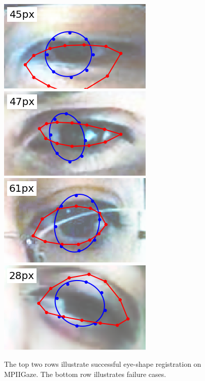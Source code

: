 \begin{figure}
    \par \vspace{0.1em}
    \includegraphics[width=0.244\columnwidth]{figs/ldmks_examples/idx_179.png}\hfill
    \includegraphics[width=0.244\columnwidth]{figs/ldmks_examples/idx_42.png}\hfill
    \includegraphics[width=0.244\columnwidth]{figs/ldmks_examples/idx_63.png}\hfill
    \includegraphics[width=0.244\columnwidth]{figs/ldmks_examples/idx_96.png}
    \caption{The top two rows illustrate successful eye-shape registration on MPIIGaze. The bottom row illustrates failure cases.}
    \label{fig:clnf_examples}
\end{figure}
